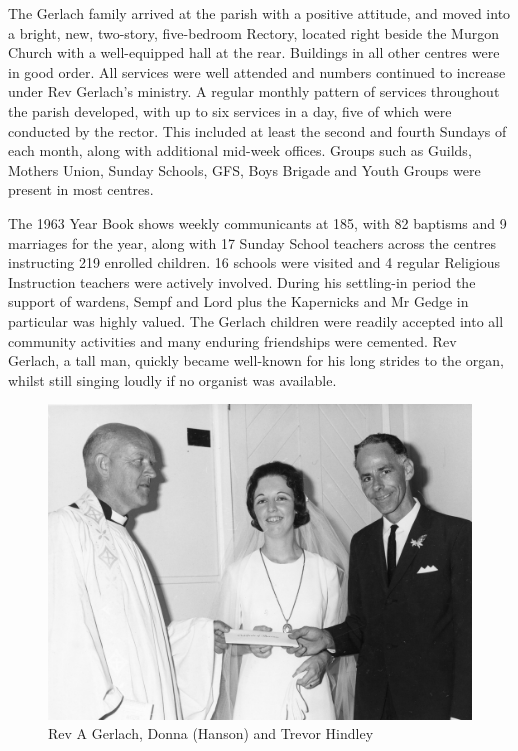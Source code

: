 The Gerlach family arrived at the parish with a positive attitude, and moved into a bright, new, two-story, five-bedroom Rectory, located right beside the Murgon Church with a well-equipped hall at the rear. Buildings in all other centres were in good order. All services were well attended and numbers continued to increase under Rev Gerlach's ministry. A regular monthly pattern of services throughout the parish developed, with up to six services in a day, five of which were conducted by the rector. This included at least the second and fourth Sundays of each month, along with additional mid-week offices. Groups such as Guilds, Mothers Union, Sunday Schools, GFS, Boys Brigade and Youth Groups were present in most centres.



The 1963 Year Book shows weekly communicants at 185, with 82 baptisms and 9 marriages for the year, along with 17 Sunday School teachers across the centres instructing 219 enrolled children. 16 schools were visited and 4 regular Religious Instruction teachers were actively involved. During his settling-in period the support of wardens, Sempf and Lord plus the Kapernicks and Mr Gedge in particular was highly valued. The Gerlach children were readily accepted into all community activities and many enduring friendships were cemented. Rev Gerlach, a tall man, quickly became well-known for his long strides to the organ, whilst still singing loudly if no organist was available.









\begin{figure}
\begin{center}
\includegraphics[width=1.\linewidth,center]{../images/donnaVestry.jpg}
\caption{Rev A Gerlach, Donna (Hanson) and Trevor Hindley}
\end{center}
\end{figure}




